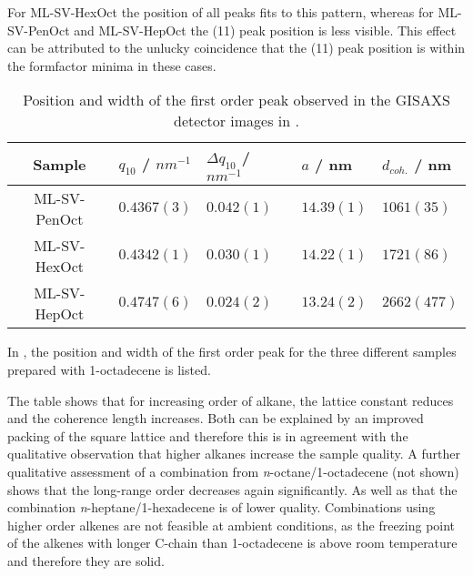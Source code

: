 \documentclass[\main/dresen_thesis.tex]{subfiles}
\begin{document}
    For ML-SV-HexOct the position of all peaks fits to this pattern, whereas for ML-SV-PenOct and ML-SV-HepOct the (11) peak position is less visible.
    This effect can be attributed to the unlucky coincidence that the (11) peak position is within the formfactor minima in these cases.
    \FloatBarrier

    \begin{table}[tb]
      \centering
      \caption{\label{tab:monolayers:solventProperties:GisaxsLatticeParams}Position and width of the first order peak observed in the GISAXS detector images in .}
      \begin{tabular}{ c || l | l || l | l }
        Sample  & $q_{10}$ / $\unit{nm^{-1}}$ & $\Delta q_{10}$ / $nm^{-1}$ & $a$ / nm & $d_{coh.}$ / nm \\
        \hline
        ML-SV-PenOct
          & $0.4367(3)$
          & $0.042(1)$
          & $14.39(1)$
          & $1061(35)$\\
        ML-SV-HexOct
          & $0.4342(1)$
          & $0.030(1)$
          & $14.22(1)$
          & $1721(86)$\\
        ML-SV-HepOct
          & $0.4747(6)$
          & $0.024(2)$
          & $13.24(2)$
          & $2662(477)$\\
        \hline
      \end{tabular}
    \end{table}

    
    In , the position and width of the first order peak for the three different samples prepared with 1-octadecene is listed.

    The table shows that for increasing order of alkane, the lattice constant reduces and the coherence length increases.
    Both can be explained by an improved packing of the square lattice and therefore this is in agreement with the qualitative observation that higher alkanes increase the sample quality.
    A further qualitative assessment of a combination from \textit{n}-octane/1-octadecene (not shown) shows that the long-range order decreases again significantly.
    As well as that the combination \textit{n}-heptane/1-hexadecene is of lower quality.
    Combinations using higher order alkenes are not feasible at ambient conditions, as the freezing point of the alkenes with longer C-chain than 1-octadecene is above room temperature and therefore they are solid.
\end{document}
